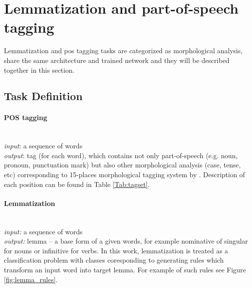 \section{Lemmatization and part-of-speech tagging}
\label{chap:tag}
Lemmatization and \acrshort{pos} tagging tasks are categorized as morphological analysis, share the same architecture and trained network and they will be described together in this section.
\subsection{Task Definition}

\paragraph{\textbf{POS tagging}} \mbox{}\\
\textit{input}: a sequence of  words \\
\textit{output}: tag (for each word), which contains not only part-of-speech (e.g. noun, pronoun, punctuation mark) but also other morphological analysis (case, tense, etc) corresponding to 15-places morphological tagging system by \cite{Hajic2004}. Description of each position can be found in Table \ref{Tab:tagset}.

\paragraph{\textbf{Lemmatization}} \mbox{}\\
\textit{input:} a sequence of words \\
\textit{output:} lemma -- a base form of a given words, for example nominative of singular for nouns or infinitive for verbs. In this work, lemmatization is treated as a classification problem with classes coresponding to generating rules which transform an input word into target lemma. For example of such rules see Figure \ref{fig:lemma_rules}. \\

